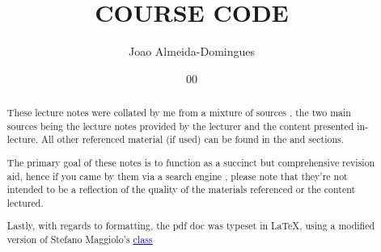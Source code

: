 \documentclass[english,course]{Notes}
\title{COURSE CODE}
\author{Joao Almeida-Domingues}
\date{00}{00}{1990}
\begin{document}

\begin{abstract}
	\par{These lecture notes were collated by me from a mixture of sources , the two main sources being the lecture notes provided by the lecturer and the 
content presented in-lecture. All other referenced material (if used) can be found in the  and  sections.}
	\par{The primary goal of these notes is to function as a succinct but comprehensive revision aid, hence if you came by them via a search engine , please note 
that they're not intended to be a reflection of the quality of the materials referenced or the content lectured.}
	\par{Lastly, with regards to formatting, the pdf doc was typeset in \LaTeX , using a modified version of Stefano Maggiolo's \href{http://blog.poormansmath.net/
latex-class-for-lecture-notes/}{\underline{\textcolor{blue}{class}}}}
\end{abstract}
\newpage





\newpage
\nocite{*}
\printbibliography

\end{document}
